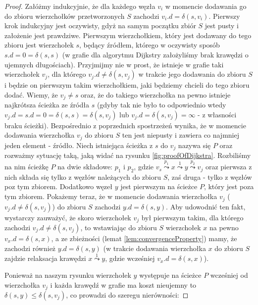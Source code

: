\begin{proof}
\label{pr:dijkstra}
Załóżmy indukcyjnie, że dla każdego węzła $v_{i}$ w momencie dodawania go do zbioru wierzchołków przetworzonych $S$ zachodzi $v_{i}.d = \delta \left( s, v_{i} \right)$. Pierwszy krok indukcyjny jest oczywisty, gdyż na samym początku zbiór $S$ jest pusty i założenie jest prawdziwe. Pierwszym wierzchołkiem, który jest dodawany do tego zbioru jest wierzchołek $s$, będący źródłem, którego w oczywisty sposób $s.d = 0 = \delta \left( s, s \right)$ (w grafie dla algorytmu Dijkstry założyliśmy brak krawędzi o ujemnych długościach). Przyjmijmy nie w prost, że istnieje w grafie taki wierzchołek $v_{j}$, dla którego $v_{j}.d \neq \delta \left( s, v_{j} \right)$ w trakcie jego dodawania do zbioru $S$ i będzie on pierwszym takim wierzchołkiem, jaki będziemy chcieli do tego zbioru dodać. Wiemy, że $v_{j} \neq s$ oraz, że do takiego wierzchołka na pewno istnieje najkrótsza ścieżka ze źródła $s$ (gdyby tak nie było to odpowiednio wtedy $v_{j}.d = s.d = 0 = \delta \left( s, s \right) = \delta \left( s, v_{j} \right)$ lub $v_{j}.d = \delta \left( s, v_{j} \right) = \infty $ - z własności braku ścieżki). Bezpośrednio z poprzednich spostrzeżeń wynika, że w momencie dodawania wierzchołka $v_{j}$ do zbioru $S$ ten jest niepusty i zawiera co najmniej jeden element - źródło. Niech istniejąca ścieżka z $s$ do $v_{j}$ nazywa się $P$ oraz rozważmy sytuację taką, jaką widać na rysunku \ref{fig:proofOfDijkstra}. Rozbiliśmy na nim ścieżkę $P$ na dwie składowe: $p_{1}$ i $p_{2}$, gdzie $v_{s} \overset{p_{1}}\leadsto x \overset{1}\leadsto y \overset{p_{2}}\leadsto v_{j}$ oraz pierwsza z nich składa się tylko z węzłów należących do zbioru $S$, zaś druga - tylko z węzłów poz tym zbiorem. Dodatkowo węzeł $y$ jest pierwszym na ścieżce $P$, który jest poza tym zbiorem. Pokażemy teraz, że w momencie dodawania wierzchołka $v_{j}$ ($v_{j}.d \neq \delta \left( s, v_{j} \right)$) do zbioru $S$ zachodzi $y.d = \delta \left( s, y \right)$. Aby udowodnić ten fakt, wystarczy zauważyć, że skoro wierzchołek $v_{j}$ był pierwszym takim, dla którego zachodzi $v_{j}.d \neq \delta \left( s, v_{j} \right)$, to wstawiając do zbioru $S$ wierzchołek $x$ na pewno $v_x.d = \delta \left( s, x \right)$, a ze zbieżności (lemat \ref{lem:convergenceProperty}) mamy, że zachodzi również $y.d = \delta \left( s, y \right)$ (w trakcie dodawania wierzchołka $x$ do zbioru $S$ zajdzie relaksacja krawędzi $x \overset{1}\leadsto y$, gdzie wcześniej $v_x.d = \delta \left( s, x \right)$).

Ponieważ na naszym rysunku wierzchołek $y$ występuje na ścieżce $P$ wcześniej od wierzchołka $v_{j}$ i każda krawędź w grafie ma koszt nieujemny to $ \delta \left( s, y \right) \leqslant \delta \left( s, v_{j} \right) $, co prowadzi do szeregu nierówności:


\end{proof}
